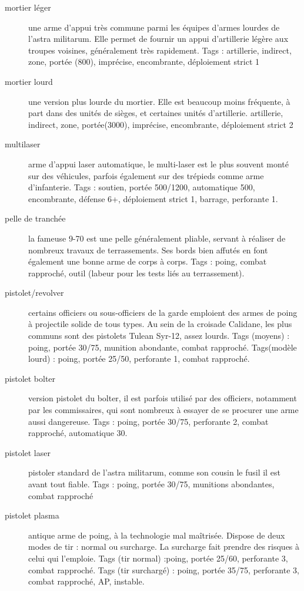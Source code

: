 \documentclass[10pt,a4paper]{article}
\begin{document}
\begin{description}
\item[mortier léger ]une arme d'appui très commune parmi les équipes d'armes lourdes de l'astra militarum. Elle permet de fournir un appui d'artillerie légère aux troupes voisines, généralement très rapidement. Tags : artillerie, indirect, zone, portée (800), imprécise, encombrante, déploiement strict 1
\item[mortier lourd]une version plus lourde du mortier. Elle est beaucoup moins fréquente, à part dans des unités de sièges, et certaines unités d'artillerie. artillerie, indirect, zone, portée(3000), imprécise, encombrante, déploiement strict 2
\item[multilaser]arme d'appui laser automatique, le multi-laser est le plus souvent monté sur des véhicules, parfois également sur des trépieds comme arme d'infanterie. Tags : soutien, portée 500/1200, automatique 500, encombrante, défense 6+, déploiement strict 1, barrage, perforante 1.
\item[pelle de tranchée]la fameuse 9-70 est une pelle généralement pliable, servant à réaliser de nombreux travaux de terrassements. Ses bords bien affutés en font également une bonne arme de corps à corps. Tags : poing, combat rapproché, outil (labeur pour les tests liés au terrassement).
\item[pistolet/revolver]certains officiers ou sous-officiers de la garde emploient des armes de poing à projectile solide de tous types. Au sein de la croisade Calidane, les plus communs sont des pistolets Tulean Syr-12, assez lourds. Tags (moyens) : poing, portée 30/75, munition abondante, combat rapproché. Tags(modèle lourd) : poing, portée 25/50, perforante 1, combat rapproché.
\item[pistolet bolter]version pistolet du bolter, il est parfois utilisé par des officiers, notamment par les commissaires, qui sont nombreux à essayer de se procurer une arme aussi dangereuse. Tags : poing, portée 30/75, perforante 2, combat rapproché, automatique 30.
\item[pistolet laser] pistoler standard de l'astra militarum, comme son cousin le fusil il est avant tout fiable. Tags : poing, portée 30/75, munitions abondantes, combat rapproché
\item[pistolet plasma]antique arme de poing, à la technologie mal maîtrisée. Dispose de deux modes de tir : normal ou surcharge. La surcharge fait prendre des risques à celui qui l'emploie. Tags (tir normal) :poing, portée 25/60, perforante 3, combat rapproché. Tags (tir surchargé) : poing, portée 35/75, perforante 3, combat rapproché, AP, instable.
\end{description}
\end{document}
